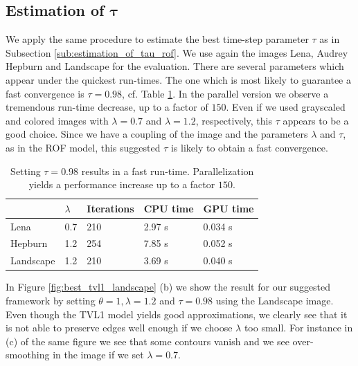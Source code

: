 \documentclass[abstracton]{scrreprt}
\begin{document}
        \subsection{Estimation of $\boldsymbol{\tau}$} %
        \label{sub:estimation_of_tau_tvl1}
            
            We apply the same procedure to estimate the best time-step parameter $\tau$ as in Subsection \ref{sub:estimation_of_tau_rof}. We use again the images Lena, Audrey Hepburn and Landscape for the evaluation. There are several parameters which appear under the quickest run-times. The one which is most likely to guarantee a fast convergence is $\tau = 0.98$, cf. Table \ref{tab:tvl1_cpu_vs_gpu}. In the parallel version we observe a tremendous run-time decrease, up to a factor of $150$. Even if we used grayscaled and colored images with $\lambda = 0.7$ and $\lambda = 1.2$, respectively, this $\tau$ appears to be a good choice. Since we have a coupling of the image and the parameters $\lambda$ and $\tau$, as in the ROF model, this suggested $\tau$ is likely to obtain a fast convergence.
            \begin{table}[!ht]
                \centering
                \begin{tabular}{| l || l | l | l | l |}
                    \hline
                    & $\lambda$ & Iterations & CPU time & GPU time \\ \hline
                    Lena & 0.7 & 210 & 2.97 s & 0.034 s \\ \hline
                    Hepburn & 1.2 & 254 & 7.85 s & 0.052 s \\ \hline
                    Landscape & 1.2 & 210 & 3.69 s & 0.040 s \\ \hline
                \end{tabular}
                \caption[Run-times for best parameters in TVL1 model.]{Setting $\tau = 0.98$ results in a fast run-time. Parallelization yields a performance increase up to a factor $150$.}
                \label{tab:tvl1_cpu_vs_gpu}
            \end{table}
            In Figure \ref{fig:best_tvl1_landscape} (b) we show the result for our suggested framework by setting $\theta = 1, \lambda = 1.2$ and $\tau = 0.98$ using the Landscape image. Even though the TVL1 model yields good approximations, we clearly see that it is not able to preserve edges well enough if we choose $\lambda$ too small. For instance in (c) of the same figure we see that some contours vanish and we see over-smoothing in the image if we set $\lambda = 0.7$.\\
\end{document}
